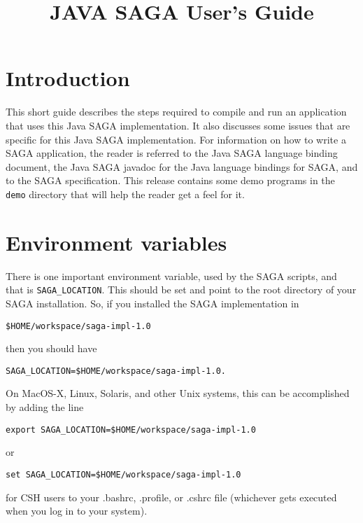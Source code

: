\documentclass[a4paper,10pt]{article}
\begin{document}
\title{JAVA SAGA User's Guide}

\maketitle

\section{Introduction}

This short guide describes the steps required to compile
and run an application that uses this Java SAGA implementation.
It also discusses some issues that are specific for this
Java SAGA implementation.
For information on how to write a SAGA application, the reader is referred
to the Java SAGA language binding document, the Java SAGA javadoc for the
Java language bindings for SAGA, and to the SAGA specification.
This release contains some demo programs in the \texttt{demo}
directory that will help the reader get a feel for it.

\section{Environment variables}

There is one important environment variable, used by the SAGA scripts,
and that is \texttt{SAGA\_LOCATION}. This should be set and point to the root
directory of your SAGA installation. So, if you installed the SAGA
implementation in 

\noindent
{\small
\begin{verbatim}
$HOME/workspace/saga-impl-1.0
\end{verbatim}
}
\noindent

then you should have

\noindent
{\small
\begin{verbatim}
SAGA_LOCATION=$HOME/workspace/saga-impl-1.0.
\end{verbatim}
}
\noindent

On MacOS-X, Linux, Solaris, and other Unix systems, this can be accomplished
by adding the line
\noindent
{\small
\begin{verbatim}
export SAGA_LOCATION=$HOME/workspace/saga-impl-1.0
\end{verbatim}
}
\noindent
or
\noindent
{\small
\begin{verbatim}
set SAGA_LOCATION=$HOME/workspace/saga-impl-1.0
\end{verbatim}
}
\noindent
for CSH users to your .bashrc, .profile, or .cshrc file (whichever gets
executed when you log in to your system).
\end{document}
